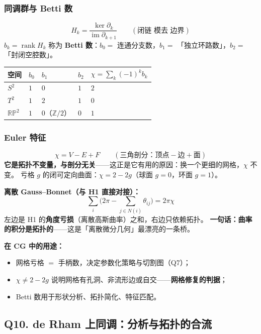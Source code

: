 \subsubsection{同调群与 Betti 数}

\[
H_k=\frac{\ker\partial_k}{\operatorname{im}\partial_{k+1}}
\qquad(\text{闭链 模去 边界})
\]
$b_k=\operatorname{rank}H_k$ 称为 \textbf{Betti 数}：$b_0=$ 连通分支数，$b_1=$ 「独立环路数」，$b_2=$ 「封闭空腔数」。

\begin{center}
\begin{tabular}{l l l l l}
\toprule
\textbf{空间} & $b_0$ & $b_1$ & $b_2$ & $\chi=\sum_k(-1)^kb_k$ \\
\midrule
$S^2$ & $1$ & $0$ & $1$ & $2$ \\
$T^2$ & $1$ & $2$ & $1$ & $0$ \\
$\mathbb{RP}^2$ & $1$ & $0$（$\mathbb Z/2$）& $0$ & $1$ \\
\bottomrule
\end{tabular}
\end{center}

\subsubsection{Euler 特征}

\[
\chi=V-E+F\qquad(\text{三角剖分：顶点}-\text{边}+\text{面})
\]
\textbf{它是拓扑不变量，与剖分无关}——这正是它有用的原因：换一个更细的网格，$\chi$ 不变。
亏格 $g$ 的闭可定向曲面：$\chi=2-2g$（球面 $g=0$，环面 $g=1$）。

\textbf{离散 Gauss--Bonnet（与 H1 直接对接）：}
\[
\sum_{i}\Big(2\pi-\sum_{j\in N(i)}\theta_{ij}\Big)=2\pi\chi
\]
左边是 H1 的\textbf{角度亏损}（离散高斯曲率）之和，右边只依赖拓扑。
\textbf{一句话：曲率的积分是拓扑的}——这是「离散微分几何」最漂亮的一条桥。

\textbf{在 CG 中的用途：}
\begin{itemize}
  \item 网格亏格 $=$ 手柄数，决定参数化策略与切割图（Q7）；
  \item $\chi\ne2-2g$ 说明网格有孔洞、非流形边或自交——\textbf{网格修复的判据}；
  \item Betti 数用于形状分析、拓扑简化、特征匹配。
\end{itemize}

\subsection{Q10. de Rham 上同调：分析与拓扑的合流}


